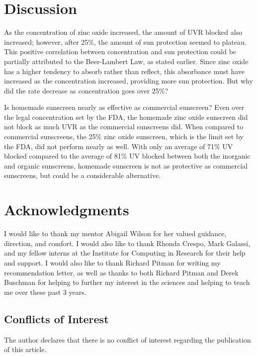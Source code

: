 \documentclass{article}
\begin{document}
\section{Discussion}
As the concentration of zinc oxide increased, the amount of UVR blocked also increased; however, after 25\%, the amount of sun protection seemed to plateau. This positive correlation between concentration and sun protection could be partially attributed to the Beer-Lambert Law, as stated earlier. Since zinc oxide has a higher tendency to absorb rather than reflect, this absorbance must have increased as the concentration increased, providing more sun protection. But why did the rate decrease as concentration goes over 25\%?

Is homemade sunscreen nearly as effective as commercial sunscreen? Even over the legal concentration set by the FDA, the homemade zinc oxide sunscreen did not block as much UVR as the commercial sunscreens did. When compared to commercial sunscreens, the 25\% zinc oxide sunscreen, which is the limit set by the FDA, did not perform nearly as well. With only an average of 71\% UV blocked compared to the average of 81\% UV blocked between both the inorganic and organic sunscreens, homemade sunscreen is not as protective as commercial sunscreens, but could be a considerable alternative.

\section{Acknowledgments}
I would like to thank my mentor Abigail Wilson for her valued guidance, direction, and comfort. I would also like to thank Rhonda Crespo, Mark Galassi, and my fellow interns at the Institute for Computing in Research for their help and support. I would also like to thank Richard Pitman for writing my recommendation letter, as well as thanks to both Richard Pitman and Derek Buschman for helping to further my interest in the sciences and helping to teach me over these past 3 years.

\subsection{Conflicts of Interest}
The author declares that there is no conflict of interest regarding the publication of this article.

%
\printbibliography
\end{document}

